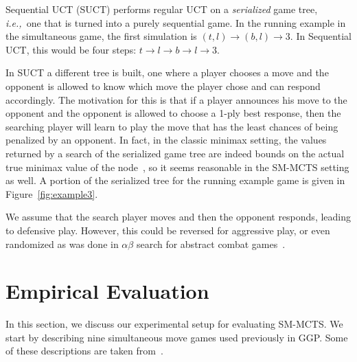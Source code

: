 \documentclass[conference]{IEEEtran}
\newcommand{\ie}{{\it i.e.,}~}
\begin{document}
Sequential UCT (SUCT) performs regular UCT on a {\it serialized} game tree, \ie one that is turned into a 
purely sequential game. 
In the running example in the simultaneous game, the first simulation is $(t,l) \rightarrow (b,l) \rightarrow 3$. 
In Sequential UCT, this would be four steps: $t \rightarrow l \rightarrow b \rightarrow l \rightarrow 3$. 

In SUCT a different tree is built, one where a player chooses a move and the opponent is 
allowed to know which move the player chose and can respond accordingly. 
The motivation for this is that if a player
announces his move to the opponent and the opponent is allowed to choose a 1-ply best response, then the searching player
will learn to play the move that has the least chances of being penalized by an opponent. In fact, in the classic 
minimax setting, the values returned by a search of the serialized game tree are indeed bounds on the actual true 
minimax value of the node~\cite[Corollary 4.2]{Bosansky13Using}, so it seems reasonable in the SM-MCTS setting as well. 
A portion of the serialized tree for the running example game is given in Figure~\ref{fig:example3}. 

We assume that the search player moves and then the opponent responds, leading to 
defensive play. However, this could be reversed for aggressive play, or even randomized as was 
done in $\alpha\beta$ search for abstract combat games~\cite{Kovarsky05RAB}.



\section{Empirical Evaluation}
\label{sec:exp}

In this section, we discuss our experimental setup for evaluating SM-MCTS.
We start by describing nine simultaneous move games used previously in GGP. Some of these 
descriptions are taken from~\cite[Appendix C]{Finnsson12}.

\end{document}
